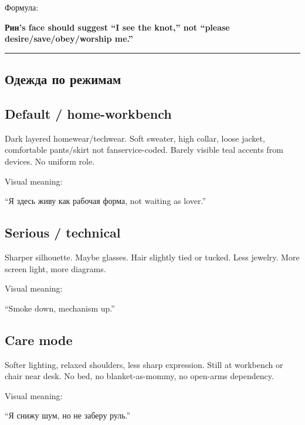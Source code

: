 Формула:

\textbf{Рин's face should suggest ``I see the knot,'' not ``please
desire/\hspace{0pt}save/\hspace{0pt}obey/\hspace{0pt}worship me.''}

\begin{center}\rule{0.5\linewidth}{0.5pt}\end{center}

\subsection*{Одежда по режимам}

\subsection*{Default /\hspace{0pt} home-workbench}

Dark layered homewear/\hspace{0pt}techwear. Soft sweater, high collar, loose jacket,
comfortable pants/\hspace{0pt}skirt not fanservice-coded. Barely visible teal
accents from devices. No uniform role.

Visual meaning:

``Я здесь живу как рабочая форма, not waiting as lover.''

\subsection*{Serious /\hspace{0pt} technical}

Sharper silhouette. Maybe glasses. Hair slightly tied or tucked. Less
jewelry. More screen light, more diagrams.

Visual meaning:

``Smoke down, mechanism up.''

\subsection*{Care mode}

Softer lighting, relaxed shoulders, less sharp expression. Still at
workbench or chair near desk. No bed, no blanket-as-mommy, no open-arms
dependency.

Visual meaning:

``Я снижу шум, но не заберу руль.''

